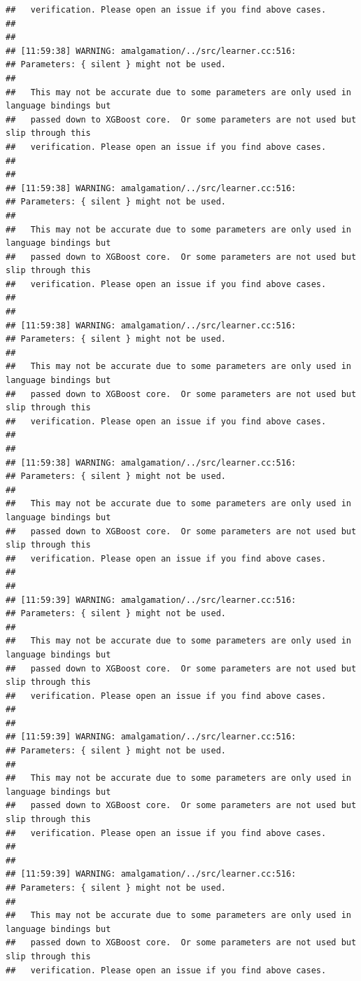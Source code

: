 \documentclass[AMS,STIX2COL]{WileyNJD-v2}\usepackage[]{graphicx}\usepackage[]{color}
\makeatletter
\newenvironment{kframe}{%
 \def\at@end@of@kframe{}%
 \ifinner\ifhmode%
  \def\at@end@of@kframe{\end{minipage}}%
  \begin{minipage}{\columnwidth}%
 \fi\fi%
 \def\FrameCommand##1{\hskip\@totalleftmargin \hskip-\fboxsep
 \colorbox{shadecolor}{##1}\hskip-\fboxsep
     \hskip-\linewidth \hskip-\@totalleftmargin \hskip\columnwidth}%
 \MakeFramed {\advance\hsize-\width
   \@totalleftmargin\z@ \linewidth\hsize
   \@setminipage}}%
 {\par\unskip\endMakeFramed%
 \at@end@of@kframe}
\newenvironment{knitrout}{}{} %
\makeatother
\begin{document}
\begin{knitrout}
\begin{kframe}
\begin{verbatim}
##   verification. Please open an issue if you find above cases.
## 
## 
## [11:59:38] WARNING: amalgamation/../src/learner.cc:516: 
## Parameters: { silent } might not be used.
## 
##   This may not be accurate due to some parameters are only used in language bindings but
##   passed down to XGBoost core.  Or some parameters are not used but slip through this
##   verification. Please open an issue if you find above cases.
## 
## 
## [11:59:38] WARNING: amalgamation/../src/learner.cc:516: 
## Parameters: { silent } might not be used.
## 
##   This may not be accurate due to some parameters are only used in language bindings but
##   passed down to XGBoost core.  Or some parameters are not used but slip through this
##   verification. Please open an issue if you find above cases.
## 
## 
## [11:59:38] WARNING: amalgamation/../src/learner.cc:516: 
## Parameters: { silent } might not be used.
## 
##   This may not be accurate due to some parameters are only used in language bindings but
##   passed down to XGBoost core.  Or some parameters are not used but slip through this
##   verification. Please open an issue if you find above cases.
## 
## 
## [11:59:38] WARNING: amalgamation/../src/learner.cc:516: 
## Parameters: { silent } might not be used.
## 
##   This may not be accurate due to some parameters are only used in language bindings but
##   passed down to XGBoost core.  Or some parameters are not used but slip through this
##   verification. Please open an issue if you find above cases.
## 
## 
## [11:59:39] WARNING: amalgamation/../src/learner.cc:516: 
## Parameters: { silent } might not be used.
## 
##   This may not be accurate due to some parameters are only used in language bindings but
##   passed down to XGBoost core.  Or some parameters are not used but slip through this
##   verification. Please open an issue if you find above cases.
## 
## 
## [11:59:39] WARNING: amalgamation/../src/learner.cc:516: 
## Parameters: { silent } might not be used.
## 
##   This may not be accurate due to some parameters are only used in language bindings but
##   passed down to XGBoost core.  Or some parameters are not used but slip through this
##   verification. Please open an issue if you find above cases.
## 
## 
## [11:59:39] WARNING: amalgamation/../src/learner.cc:516: 
## Parameters: { silent } might not be used.
## 
##   This may not be accurate due to some parameters are only used in language bindings but
##   passed down to XGBoost core.  Or some parameters are not used but slip through this
##   verification. Please open an issue if you find above cases.

\end{verbatim}
\end{kframe}
\end{knitrout}
\end{document}
